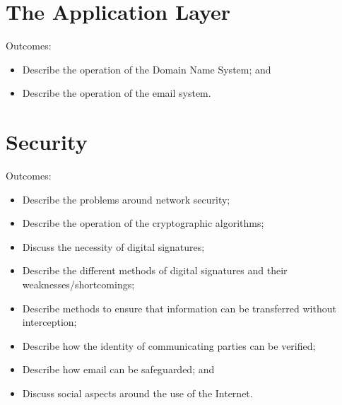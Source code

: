 \documentclass[a4paper, 12pt, titlepage]{report}
\begin{document}
\chapter{The Application Layer}
Outcomes:
\begin{itemize}
\item Describe the operation of the Domain Name System; and
\item Describe the operation of the email system.
\end{itemize}
\chapter{Security}
Outcomes:
\begin{itemize}
\item Describe the problems around network security;
\item Describe the operation of the cryptographic algorithms;
\item Discuss the necessity of digital signatures;
\item Describe the different methods of digital signatures and their weaknesses/shortcomings;
\item Describe methods to ensure that information can be transferred without interception;
\item Describe how the identity of communicating parties can be verified;
\item Describe how email can be safeguarded; and
\item Discuss social aspects around the use of the Internet.
\cite{aaronbalchunas2014}
\cite{cn2010}
\end{itemize}
%


\end{document}
